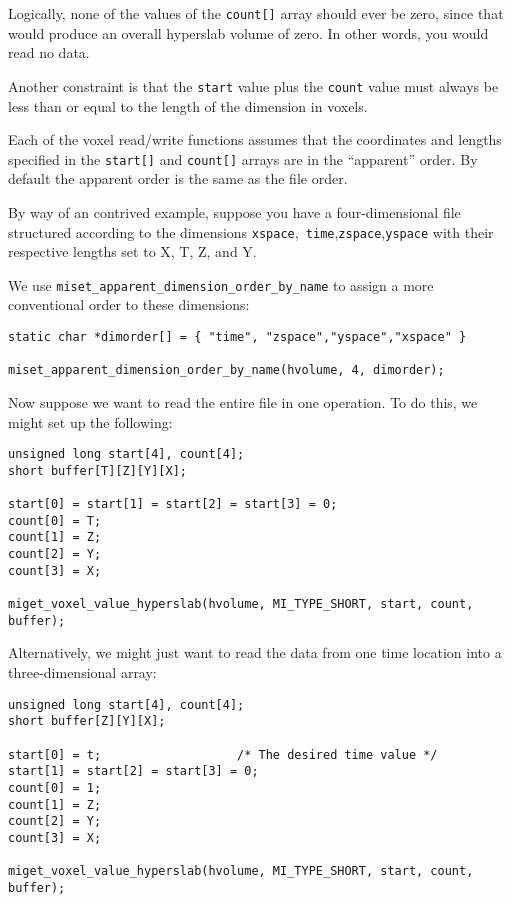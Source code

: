 \documentclass{article}
\begin{document}
Logically, none of the values of the {\tt count[]} array should ever be
zero, since that would produce an overall hyperslab volume of zero.  In other
words, you would read no data.

Another constraint is that the {\tt start} value plus the {\tt count} value
must always be less than or equal to the length of the dimension in voxels.

Each of the voxel read/write functions assumes that the coordinates
and lengths specified in the {\tt start[]} and {\tt count[]}
arrays are in the ``apparent'' order.  By default the apparent order
is the same as the file order.

By way of an contrived example, suppose you have a four-dimensional
file structured according to the dimensions {\tt xspace},{\tt
time},{\tt zspace},{\tt yspace} with their respective lengths set to
X, T, Z, and Y.

We use {\tt miset\_apparent\_dimension\_order\_by\_name} to assign a 
more conventional order to these dimensions:
\begin{verbatim}
static char *dimorder[] = { "time", "zspace","yspace","xspace" }

miset_apparent_dimension_order_by_name(hvolume, 4, dimorder);

\end{verbatim}

Now suppose we want to read the entire file in one operation.  To do
this, we might set up the following:
\begin{verbatim}
unsigned long start[4], count[4];
short buffer[T][Z][Y][X];

start[0] = start[1] = start[2] = start[3] = 0;
count[0] = T;
count[1] = Z;
count[2] = Y;
count[3] = X;

miget_voxel_value_hyperslab(hvolume, MI_TYPE_SHORT, start, count, buffer);
\end{verbatim}

Alternatively, we might just want to read the data from one time location
into a three-dimensional array:
\begin{verbatim}
unsigned long start[4], count[4];
short buffer[Z][Y][X];

start[0] = t;                   /* The desired time value */
start[1] = start[2] = start[3] = 0;
count[0] = 1;
count[1] = Z;
count[2] = Y;
count[3] = X;

miget_voxel_value_hyperslab(hvolume, MI_TYPE_SHORT, start, count, buffer);
\end{verbatim}
\end{document}
